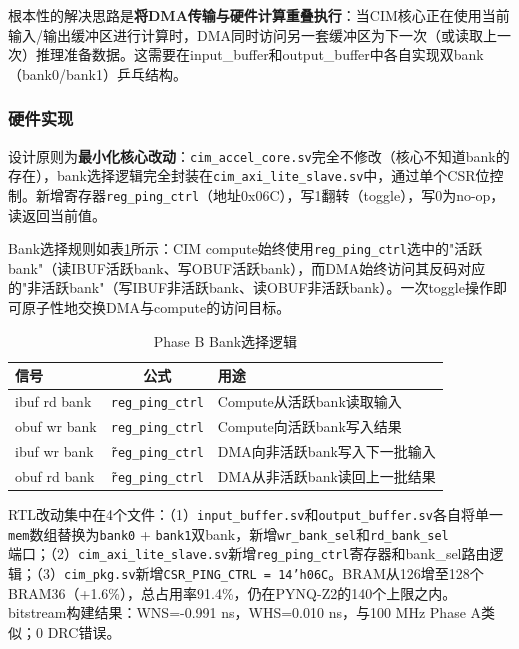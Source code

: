\documentclass[12pt, a4paper]{article}
\begin{document}
根本性的解决思路是\textbf{将DMA传输与硬件计算重叠执行}：当CIM核心正在使用当前输入/输出缓冲区进行计算时，DMA同时访问另一套缓冲区为下一次（或读取上一次）推理准备数据。这需要在input\_buffer和output\_buffer中各自实现双bank（bank0/bank1）乒乓结构。

\subsubsection{硬件实现}

设计原则为\textbf{最小化核心改动}：\texttt{cim\_accel\_core.sv}完全不修改（核心不知道bank的存在），bank选择逻辑完全封装在\texttt{cim\_axi\_lite\_slave.sv}中，通过单个CSR位控制。新增寄存器\texttt{reg\_ping\_ctrl}（地址0x06C），写1翻转（toggle），写0为no-op，读返回当前值。

Bank选择规则如表\ref{tab:phase_b_bank}所示：CIM compute始终使用\texttt{reg\_ping\_ctrl}选中的"活跃bank"（读IBUF活跃bank、写OBUF活跃bank），而DMA始终访问其反码对应的"非活跃bank"（写IBUF非活跃bank、读OBUF非活跃bank）。一次toggle操作即可原子性地交换DMA与compute的访问目标。

\begin{table}[H]
    \centering
    \caption{Phase B Bank选择逻辑}
    \label{tab:phase_b_bank}
    \begin{tabular}{lcl}
        \toprule
        信号 & 公式 & 用途 \\
        \midrule
        ibuf rd bank & \texttt{reg\_ping\_ctrl} & Compute从活跃bank读取输入 \\
        obuf wr bank & \texttt{reg\_ping\_ctrl} & Compute向活跃bank写入结果 \\
        ibuf wr bank & \texttt{\~reg\_ping\_ctrl} & DMA向非活跃bank写入下一批输入 \\
        obuf rd bank & \texttt{\~reg\_ping\_ctrl} & DMA从非活跃bank读回上一批结果 \\
        \bottomrule
    \end{tabular}
\end{table}

RTL改动集中在4个文件：（1）\texttt{input\_buffer.sv}和\texttt{output\_buffer.sv}各自将单一\texttt{mem}数组替换为\texttt{bank0} + \texttt{bank1}双bank，新增\texttt{wr\_bank\_sel}和\texttt{rd\_bank\_sel}端口；（2）\texttt{cim\_axi\_lite\_slave.sv}新增\texttt{reg\_ping\_ctrl}寄存器和bank\_sel路由逻辑；（3）\texttt{cim\_pkg.sv}新增\texttt{CSR\_PING\_CTRL = 14'h06C}。BRAM从126增至128个BRAM36（+1.6\%），总占用率91.4\%，仍在PYNQ-Z2的140个上限之内。bitstream构建结果：WNS=-0.991 ns，WHS=0.010 ns，与100 MHz Phase A类似；0 DRC错误。
\end{document}
